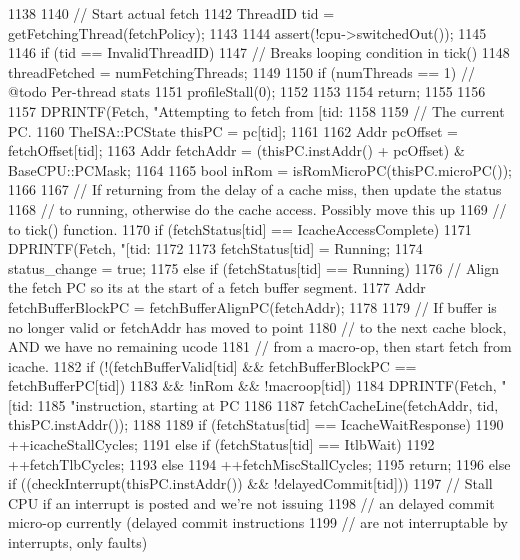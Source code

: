 \begin{DoxyCode}
1138 {
1140     // Start actual fetch
1142     ThreadID tid = getFetchingThread(fetchPolicy);
1143 
1144     assert(!cpu->switchedOut());
1145 
1146     if (tid == InvalidThreadID) {
1147         // Breaks looping condition in tick()
1148         threadFetched = numFetchingThreads;
1149 
1150         if (numThreads == 1) {  // @todo Per-thread stats
1151             profileStall(0);
1152         }
1153 
1154         return;
1155     }
1156 
1157     DPRINTF(Fetch, "Attempting to fetch from [tid:%
1158 
1159     // The current PC.
1160     TheISA::PCState thisPC = pc[tid];
1161 
1162     Addr pcOffset = fetchOffset[tid];
1163     Addr fetchAddr = (thisPC.instAddr() + pcOffset) & BaseCPU::PCMask;
1164 
1165     bool inRom = isRomMicroPC(thisPC.microPC());
1166 
1167     // If returning from the delay of a cache miss, then update the status
1168     // to running, otherwise do the cache access.  Possibly move this up
1169     // to tick() function.
1170     if (fetchStatus[tid] == IcacheAccessComplete) {
1171         DPRINTF(Fetch, "[tid:%
1172 
1173         fetchStatus[tid] = Running;
1174         status_change = true;
1175     } else if (fetchStatus[tid] == Running) {
1176         // Align the fetch PC so its at the start of a fetch buffer segment.
1177         Addr fetchBufferBlockPC = fetchBufferAlignPC(fetchAddr);
1178 
1179         // If buffer is no longer valid or fetchAddr has moved to point
1180         // to the next cache block, AND we have no remaining ucode
1181         // from a macro-op, then start fetch from icache.
1182         if (!(fetchBufferValid[tid] && fetchBufferBlockPC == fetchBufferPC[tid])
1183             && !inRom && !macroop[tid]) {
1184             DPRINTF(Fetch, "[tid:%
1185                     "instruction, starting at PC %
1186 
1187             fetchCacheLine(fetchAddr, tid, thisPC.instAddr());
1188 
1189             if (fetchStatus[tid] == IcacheWaitResponse)
1190                 ++icacheStallCycles;
1191             else if (fetchStatus[tid] == ItlbWait)
1192                 ++fetchTlbCycles;
1193             else
1194                 ++fetchMiscStallCycles;
1195             return;
1196         } else if ((checkInterrupt(thisPC.instAddr()) && !delayedCommit[tid])) {
1197             // Stall CPU if an interrupt is posted and we're not issuing
1198             // an delayed commit micro-op currently (delayed commit instructions
1199             // are not interruptable by interrupts, only faults)
}}}
\end{DoxyCode}
